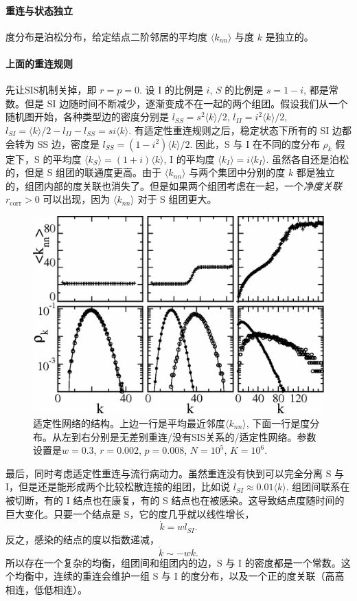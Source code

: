 \paragraph{重连与状态独立}

度分布是泊松分布，给定结点二阶邻居的平均度 $\langle k_{nn} \rangle$ 与度 $k$ 是独立的。

\paragraph{上面的重连规则}

先让SIS机制关掉，即 $r = p = 0$. 设 I 的比例是 $i$, $S$ 的比例是 $s = 1-i$, 都是常数。但是 SI 边随时间不断减少，逐渐变成不在一起的两个组团。假设我们从一个随机图开始，各种类型边的密度分别是 $l_{SS}=s^2\langle k\rangle /2 $, $l_{II}=i^2\langle k\rangle /2 $, $l_{SI}= \langle k\rangle /2 - l_{II} - l_{SS} = si\langle k\rangle $. 有适定性重连规则之后，稳定状态下所有的 SI 边都会转为 SS 边，密度是 $l_{SS} = (1-i^2)\langle k \rangle/2$. 因此，S 与 I 在不同的度分布 $\rho_k$ 假定下，S 的平均度 $\langle k_S \rangle = (1+i)\langle k\rangle $, I 的平均度 $\langle k_I \rangle = i\langle k_I \rangle$. 虽然各自还是泊松的，但是 S 组团的联通度更高。由于 $ \langle k_{nn} \rangle$ 与两个集团中分别的度 $k$ 都是独立的，组团内部的度关联也消失了。但是如果两个组团考虑在一起，一个\textit{净度关联} $r_\text{corr} > 0$ 可以出现，因为 $\langle k_{nn} \rangle$ 对于 S 组团更大。

\begin{figure}
    \centering
    \includegraphics[width = 0.5\linewidth]{Pics/rewire-structure-of-adaptive-networks.png}
    \caption{适定性网络的结构。上边一行是平均最近邻度$\langle k_{nn} \rangle$, 下面一行是度分布。从左到右分别是无差别重连/没有SIS关系的/适定性网络。参数设置是$w = 0.3$, $r = 0.002$, $p = 0.008$, $N = 10^5$, $K = 10^6$.}
    \label{fig:rewire-structure}
\end{figure}

最后，同时考虑适定性重连与流行病动力。虽然重连没有快到可以完全分离 S 与 I，但是还是能形成两个比较松散连接的组团，比如说 $l_{SI} \approx 0.01\langle k \rangle$. 组团间联系在被切断，有的 I 结点也在康复，有的 S 结点也在被感染。这导致结点度随时间的巨大变化。只要一个结点是 S，它的度几乎就以线性增长，\begin{equation}
    \dot{k} = wl_{SI}.
\end{equation} 反之，感染的结点的度以指数递减，\begin{equation}
    \dot{k} \sim -wk.
\end{equation}所以存在一个复杂的均衡，组团间和组团内的边，S 与 I 的密度都是一个常数。这个均衡中，连续的重连会维护一组 S 与 I 的度分布，以及一个正的度关联（高高相连，低低相连）。

